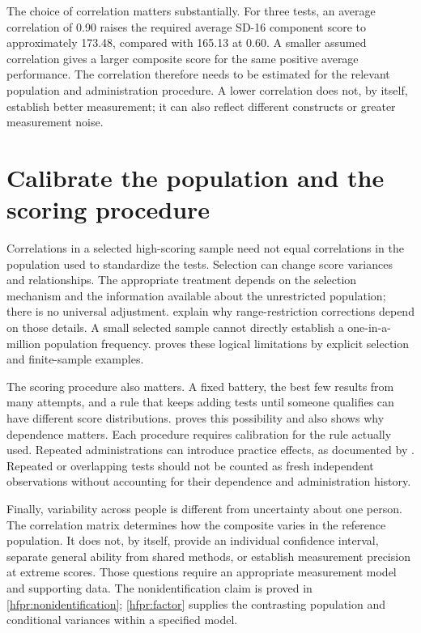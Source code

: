 The choice of correlation matters substantially. For three tests, an
average correlation of 0.90 raises the required average SD-16 component
score to approximately 173.48, compared with 165.13 at 0.60. A smaller
assumed correlation gives a larger composite score for the same positive
average performance. The correlation therefore needs to be estimated for
the relevant population and administration procedure. A lower correlation
does not, by itself, establish better measurement; it can also reflect
different constructs or greater measurement noise.

\section{Calibrate the population and the scoring procedure}

Correlations in a selected high-scoring sample need not equal correlations
in the population used to standardize the tests. Selection can change score
variances and relationships. The appropriate treatment depends on the
selection mechanism and the information available about the unrestricted
population; there is no universal adjustment. \citet{sackett2000} explain
why range-restriction corrections depend on those details. A small selected
sample cannot directly establish a one-in-a-million population frequency.
 proves these logical limitations by explicit
selection and finite-sample examples.

The scoring procedure also matters. A fixed battery, the best few results
from many attempts, and a rule that keeps adding tests until someone
qualifies can have different score distributions. 
proves this possibility and also shows why dependence matters. Each procedure requires
calibration for the rule actually used. Repeated administrations can
introduce practice effects, as documented by \citet{hausknecht2007}.
Repeated or overlapping tests should not be counted as fresh independent
observations without accounting for their dependence and administration
history.

Finally, variability across people is different from uncertainty about one
person. The correlation matrix determines how the composite varies in the
reference population. It does not, by itself, provide an individual
confidence interval, separate general ability from shared methods, or
establish measurement precision at extreme scores. Those questions require
an appropriate measurement model and supporting data.
The nonidentification claim is proved in \cref{hfpr:nonidentification};
\cref{hfpr:factor} supplies the contrasting population and conditional
variances within a specified model.

